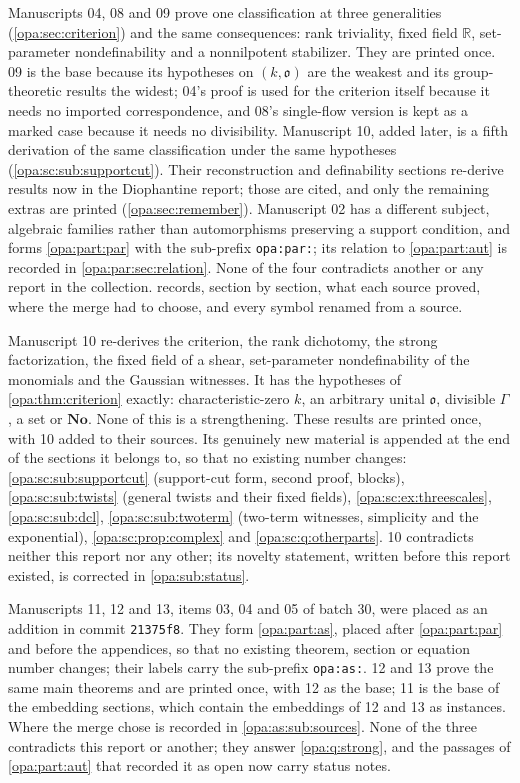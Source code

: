 \documentclass[11pt,oneside]{article}
\numberwithin{equation}{section}
\theoremstyle{definition}
\theoremstyle{remark}
\newcommand{\No}{\mathbf{No}}
\newcommand{\R}{\mathbb R}
\newcommand{\oo}{\mathfrak o}
\newcommand{\lbl}[1]{\nolinkurl{#1}}
\begin{document}
Manuscripts 04, 08 and 09 prove one classification at three generalities
(\cref{opa:sec:criterion}) and the same consequences: rank triviality, fixed
field $\R$, set-parameter nondefinability and a nonnilpotent stabilizer. They
are printed once. 09 is the base because its hypotheses on $(k,\oo)$ are the
weakest and its group-theoretic results the widest; 04's proof is used for
the criterion itself because it needs no imported correspondence, and 08's
single-flow version is kept as a marked case because it needs no
divisibility. Manuscript 10, added later, is a fifth derivation of the same
classification under the same hypotheses (\cref{opa:sc:sub:supportcut}).
Their reconstruction and definability sections re-derive
results now in the Diophantine report; those are cited, and only the
remaining extras are printed (\cref{opa:sec:remember}). Manuscript 02 has a
different subject, algebraic families rather than automorphisms preserving a
support condition, and forms \cref{opa:part:par} with the sub-prefix
\lbl{opa:par:}; its relation to \cref{opa:part:aut} is recorded in
\cref{opa:par:sec:relation}. None of the four contradicts another or any
report in the collection.  records, section by
section, what each source proved, where the merge had to choose, and every
symbol renamed from a source.

Manuscript 10 re-derives the criterion, the rank dichotomy, the strong
factorization, the fixed field of a shear, set-parameter nondefinability of
the monomials and the Gaussian witnesses. It has the hypotheses of
\cref{opa:thm:criterion} exactly: characteristic-zero $k$, an arbitrary
unital $\oo$, divisible $\Gamma$, a set or $\No$. None of this is a
strengthening. These results are printed once, with 10 added to their
sources. Its genuinely new material is appended at the end of the sections
it belongs to, so that no existing number changes:
\cref{opa:sc:sub:supportcut} (support-cut form, second proof, blocks),
\cref{opa:sc:sub:twists} (general twists and their fixed fields),
\cref{opa:sc:ex:threescales}, \cref{opa:sc:sub:dcl},
\cref{opa:sc:sub:twoterm} (two-term witnesses, simplicity and the
exponential), \cref{opa:sc:prop:complex} and \cref{opa:sc:q:otherparts}. 10
contradicts neither this report nor any other; its novelty statement, written
before this report existed, is corrected in \cref{opa:sub:status}.

Manuscripts 11, 12 and 13, items 03, 04 and 05 of batch 30, were placed as an
addition in commit \texttt{21375f8}. They form \cref{opa:part:as}, placed after
\cref{opa:part:par} and before the appendices, so that no existing theorem,
section or equation number changes; their labels carry the sub-prefix
\lbl{opa:as:}. 12 and 13 prove the same main theorems and are printed once, with
12 as the base; 11 is the base of the embedding sections, which contain the
embeddings of 12 and 13 as instances. Where the merge chose is recorded in
\cref{opa:as:sub:sources}. None of the three contradicts this report or another;
they answer \cref{opa:q:strong}, and the passages of
\cref{opa:part:aut} that recorded it as open now carry status notes.
\end{document}
